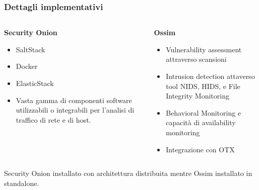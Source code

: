 \begin{frame}
    \frametitle{Dettagli implementativi}
    \begin{columns}[t]
        \centering
        \begin{column}{0.45\textwidth}
            \textbf{Security Onion}
            \begin{itemize}
                \item SaltStack
                \item Docker
                \item ElasticStack
                \item Vasta gamma di componenti software utilizzabili o integrabili per l'analisi di traffico di rete e di host.
            \end{itemize}
        \end{column}
        \begin{column}{0.45\textwidth}
            \textbf{Ossim}
            \begin{itemize}
                \item Vulnerability assessment attraverso scansioni
                \item Intrusion detection attaverso tool NIDS, HIDS, e File Integrity Monitoring
                \item Behavioral Monitoring e capacità di availability monitoring
                \item Integrazione con OTX
            \end{itemize}
        \end{column}
    \end{columns}
    \bigskip
    Security Onion installato con architettura distribuita mentre Ossim installato in standalone.
\end{frame}


